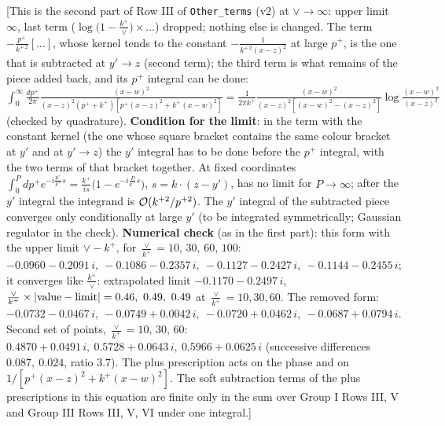 \documentclass[10pt]{article}
\begin{document}
{[This is the second part of Row III of \texttt{Other\_terms} (v2) at $\vee\to\infty$: upper limit $\infty$, last term ($\log\big(1-\frac{k^{+}}{\vee}\big)\times\dots$) dropped; nothing else is changed. The term $-\frac{p^{+}}{k^{+\,2}}[\dots]$, whose kernel tends to the constant $-\frac{1}{k^{+\,2}(x-z)^{2}}$ at large $p^{+}$, is the one that is subtracted at $y'\to z$ (second term); the third term is what remains of the piece added back, and its $p^{+}$ integral can be done: $\int_{0}^{\infty}\frac{dp^{+}}{2\pi}\frac{(x-w)^{2}}{(x-z)^{2}(p^{+}+k^{+})[p^{+}(x-z)^{2}+k^{+}(x-w)^{2}]}=\frac{1}{2\pi k^{+}}\frac{(x-w)^{2}}{(x-z)^{2}[(x-w)^{2}-(x-z)^{2}]}\log\frac{(x-w)^{2}}{(x-z)^{2}}$ (checked by quadrature). \textbf{Condition for the limit}: in the term with the constant kernel (the one whose square bracket contains the same colour bracket at $y'$ and at $y'\to z$) the $y'$ integral has to be done before the $p^{+}$ integral, with the two terms of that bracket together. At fixed coordinates $\int_{0}^{P}dp^{+}e^{-i\frac{p^{+}}{k^{+}}s}=\frac{k^{+}}{is}\big(1-e^{-i\frac{P}{k^{+}}s}\big)$, $s=k\cdot(z-y')$, has no limit for $P\to\infty$; after the $y'$ integral the integrand is ${\cal O}(k^{+2}/p^{+2})$. The $y'$ integral of the subtracted piece converges only conditionally at large $y'$ (to be integrated symmetrically; Gaussian regulator in the check). \textbf{Numerical check} (as in the first part): this form with the upper limit $\vee-k^{+}$, for $\frac{\vee}{k^{+}}=10,\,30,\,60,\,100$: $-0.0960-0.2091\,i,\ -0.1086-0.2357\,i,\ -0.1127-0.2427\,i,\ -0.1144-0.2455\,i$; it converges like $\frac{k^{+}}{\vee}$: extrapolated limit $-0.1170-0.2497\,i$, $\frac{\vee}{k^{+}}\times|{\rm value}-{\rm limit}|=0.46,\ 0.49,\ 0.49$ at $\frac{\vee}{k^{+}}=10,30,60$. The removed form: $-0.0732-0.0467\,i,\ -0.0749+0.0042\,i,\ -0.0720+0.0462\,i,\ -0.0687+0.0794\,i$. Second set of points, $\frac{\vee}{k^{+}}=10,\,30,\,60$: $0.4870+0.0491\,i,\ 0.5728+0.0643\,i,\ 0.5966+0.0625\,i$ (successive differences $0.087,\ 0.024$, ratio $3.7$). The plus prescription acts on the phase and on $1/[p^{+}(x-z)^{2}+k^{+}(x-w)^{2}]$. The soft subtraction terms of the plus prescriptions in this equation are finite only in the sum over Group I Rows III, V and Group III Rows III, V, VI under one integral.]\par\noindent}\par
\end{document}
